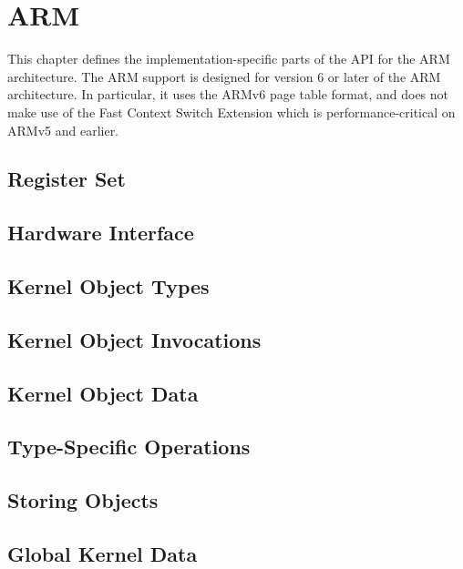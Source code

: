 \documentclass[a4paper,11pt,twoside]{report}
\begin{document}
\chapter{ARM}

This chapter defines the implementation-specific parts of the API for the ARM architecture. The ARM support is designed for version 6 or later of the ARM architecture. In particular, it uses the ARMv6 page table format, and does not make use of the Fast Context Switch Extension which is performance-critical on ARMv5 and earlier.

\section{Register Set}


\section{Hardware Interface}


\section{Kernel Object Types}


\section{Kernel Object Invocations}


\section{Kernel Object Data}


\section{Type-Specific Operations}


\section{Storing Objects}


\section{Global Kernel Data}

\end{document}
